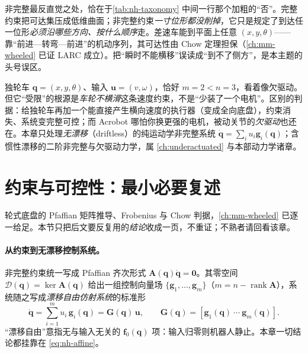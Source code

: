 \begin{insight}\label{ins:nh-essence}
非完整最反直觉之处，恰在于\cref{tab:nh-taxonomy} 中间一行那个加粗的“否”。完整约束把可达集压成低维曲面；非完整约束\emph{一寸位形都没削掉}，它只是规定了到达任一位形\emph{必须沿哪些方向、按什么顺序}走。差速车能到平面上任意 $(x,y,\theta)$——靠“前进—转弯—前进”的机动序列，其可达性由 Chow 定理担保（\cref{ch:mm-wheeled} 已证 LARC 成立）。把“瞬时不能横移”误读成“到不了侧方”，是本主题的头号误区。
\end{insight}

\begin{pitfall}[误区：非完整 $=$ 欠驱动]
独轮车 $\mathbf{q}=(x,y,\theta)$、输入 $\mathbf{u}=(v,\omega)$，恰好 $m=2<n=3$，看着像欠驱动。但它“受限”的根源是\emph{车轮不横滑}这条速度约束，不是“少装了一个电机”。区别的判据：给独轮车再加一个能直接产生横向速度的执行器（变成全向底盘），约束消失、系统变完整可控；而 Acrobot 哪怕你换更强的电机，被动关节的\emph{欠驱动}也还在。本章只处理\emph{无漂移}（driftless）的纯运动学非完整系统 $\dot{\mathbf{q}}=\sum_i u_i\mathbf{g}_i(\mathbf{q})$；含惯性漂移的二阶非完整与欠驱动力学，属 \cref{ch:underactuated} 与本部动力学诸章。
\end{pitfall}

\section{约束与可控性：最小必要复述}
\label{sec:nh-recap}

轮式底盘的 Pfaffian 矩阵推导、Frobenius 与 Chow 判据，\cref{ch:mm-wheeled} 已逐一给足。本节只把后文要反复用的\emph{结论}收成一页，不重证；不熟者请回看该章。

\paragraph{从约束到无漂移控制系统。}
非完整约束统一写成 Pfaffian 齐次形式 $\mathbf{A}(\mathbf{q})\dot{\mathbf{q}}=\mathbf{0}$。其零空间 $\mathcal{D}(\mathbf{q})=\ker\mathbf{A}(\mathbf{q})$ 给出一组控制向量场 $\{\mathbf{g}_1,\dots,\mathbf{g}_m\}$（$m=n-\operatorname{rank}\mathbf{A}$），系统随之写成\emph{漂移自由仿射系统}的标准形
\begin{equation}
  \dot{\mathbf{q}}=\sum_{i=1}^{m}u_i\,\mathbf{g}_i(\mathbf{q})=\mathbf{G}(\mathbf{q})\,\mathbf{u},
  \qquad \mathbf{G}(\mathbf{q})=[\mathbf{g}_1(\mathbf{q})\ \cdots\ \mathbf{g}_m(\mathbf{q})].
  \label{eq:nh-affine}
\end{equation}
“漂移自由”意指无与输入无关的 $\mathbf{f}_0(\mathbf{q})$ 项：输入归零则机器人静止。本章一切结论都挂靠在 \cref{eq:nh-affine}。

